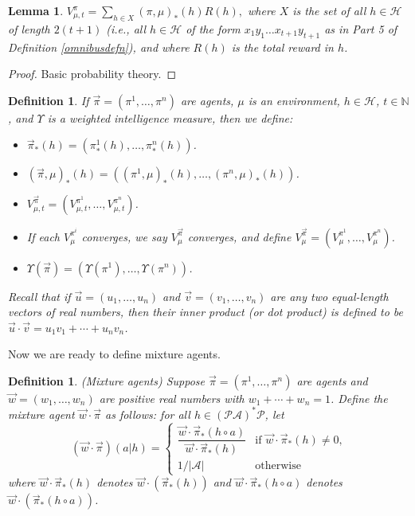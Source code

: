 \documentclass{article}
\newtheorem{definition}[theorem]{Definition}
\newtheorem{lemma}[theorem]{Lemma}
\begin{document}
\begin{lemma}
\label{basicprobabilitylemma}
    $V^\pi_{\mu,t}=\sum_{h\in X}(\pi,\mu)_*(h)R(h),$
    where $X$ is the set of all $h\in\mathcal H$
    of length $2(t+1)$ (i.e., all $h\in\mathcal H$ of the form
    $x_1y_1\ldots x_{t+1}y_{t+1}$
    as in Part 5 of Definition \ref{omnibusdefn}),
    and where $R(h)$ is the total reward in $h$.
\end{lemma}

\begin{proof}
    Basic probability theory.
\end{proof}

\begin{definition}
    If $\vec\pi=(\pi^1,\ldots,\pi^n)$ are agents, $\mu$ is an environment,
    $h\in\mathcal H$, $t\in\mathbb N$, and $\Upsilon$ is a weighted
    intelligence measure, then we define:
    \begin{itemize}
        \item $\vec\pi_*(h)=(\pi^1_*(h),\ldots,\pi^n_*(h))$.
        \item $(\vec\pi,\mu)_*(h)=((\pi^1,\mu)_*(h),\ldots,(\pi^n,\mu)_*(h))$.
        \item $V^{\vec\pi}_{\mu,t}=(V^{\pi^1}_{\mu,t},\ldots,V^{\pi^n}_{\mu,t})$.
        \item If each $V^{\pi^i}_\mu$ converges, we say $V^{\vec\pi}_\mu$
            converges, and define $V^{\vec\pi}_\mu=(V^{\pi^1}_\mu,\ldots,V^{\pi^n}_\mu)$.
        \item $\Upsilon(\vec\pi)=(\Upsilon(\pi^1),\ldots,\Upsilon(\pi^n))$.
    \end{itemize}
    Recall that if $\vec u=(u_1,\ldots,u_n)$ and
    $\vec v=(v_1,\ldots,v_n)$ are any two equal-length
    vectors of real numbers, then their \emph{inner product}
    (or \emph{dot product}) is defined to be
    $\vec u\cdot \vec v=u_1v_1+\cdots+u_nv_n$.
\end{definition}

Now we are ready to define mixture agents.

\begin{definition}
\label{maindefn}
    (Mixture agents)
    Suppose $\vec\pi=(\pi^1,\ldots,\pi^n)$ are agents and $\vec w=(w_1,\ldots,w_n)$
    are positive real numbers with $w_1+\cdots+w_n=1$.
    Define the \emph{mixture agent} $\vec w\cdot\vec\pi$ as follows: for all
    $h\in (\mathcal P\mathcal A)^*\mathcal P$, let
    \[
        (\vec w\cdot\vec\pi)(a|h)
        =
        \begin{cases}
            \dfrac{\vec w\cdot \vec\pi_*(h\circ a)}{\vec w\cdot \vec\pi_*(h)}
            &\mbox{if $\vec w\cdot \vec\pi_*(h)\not=0$,}\\
            1/|\mathcal{A}| &\mbox{otherwise}
        \end{cases}
    \]
    where
    $\vec w\cdot\vec\pi_*(h)$ denotes $\vec w\cdot(\vec\pi_*(h))$ and
    $\vec w\cdot\vec\pi_*(h\circ a)$ denotes
    $\vec w\cdot(\vec\pi_*(h\circ a))$.
\end{definition}
\end{document}
